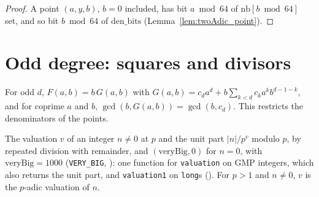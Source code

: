 \begin{proof}
  \leanok
  A point $(a, y, b)$, $b = 0$ included, has bit $a \bmod 64$ of $\mathrm{nb}[b \bmod 64]$ set, and
  so bit $b \bmod 64$ of $\mathrm{den\_bits}$ (Lemma~\ref{lem:twoAdic_point}).
\end{proof}

\section{Odd degree: squares and divisors}\label{sec:oddDegree}

For odd $d$, $F(a, b) = b \, G(a, b)$ with
$G(a, b) = c_d a^d + b \sum_{k < d} c_k a^k b^{d - 1 - k}$, and for coprime $a$ and $b$,
$\gcd(b, G(a, b)) = \gcd(b, c_d)$. This restricts the denominators of the points.

\begin{definition}\label{def:valuation}
  \leanok
  The valuation $v$ of an integer $n \ne 0$ at $p$ and the unit part $|n| / p^v$ modulo $p$, by
  repeated division with remainder, and $(\mathrm{veryBig}, 0)$ for $n = 0$, with
  $\mathrm{veryBig} = 1000$ (\verb|VERY_BIG|, ): one function for
  \verb|valuation| on GMP integers, which also returns the unit part, and \verb|valuation1| on
  \verb|long|s (). For $p > 1$ and $n \ne 0$, $v$ is the $p$-adic
  valuation of $n$.
\end{definition}

